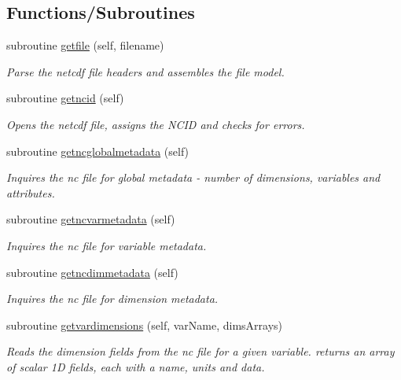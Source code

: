 \subsection*{Functions/\+Subroutines}
\begin{DoxyCompactItemize}
\item 
subroutine \mbox{\hyperlink{namespacenetcdfparser__mod_a57c39a4003778a6bf90cfd36b69380bc}{getfile}} (self, filename)
\begin{DoxyCompactList}\small\item\em Parse the netcdf file headers and assembles the file model. \end{DoxyCompactList}\item 
subroutine \mbox{\hyperlink{namespacenetcdfparser__mod_a741dd5b5985255e73aa9d3cf08755e91}{getncid}} (self)
\begin{DoxyCompactList}\small\item\em Opens the netcdf file, assigns the N\+C\+ID and checks for errors. \end{DoxyCompactList}\item 
subroutine \mbox{\hyperlink{namespacenetcdfparser__mod_a409f59662d71fb63e5fb5e057fdfd6ee}{getncglobalmetadata}} (self)
\begin{DoxyCompactList}\small\item\em Inquires the nc file for global metadata -\/ number of dimensions, variables and attributes. \end{DoxyCompactList}\item 
subroutine \mbox{\hyperlink{namespacenetcdfparser__mod_a46989199271acb6205cc61ac413d5a56}{getncvarmetadata}} (self)
\begin{DoxyCompactList}\small\item\em Inquires the nc file for variable metadata. \end{DoxyCompactList}\item 
subroutine \mbox{\hyperlink{namespacenetcdfparser__mod_a6354ee8b3c773cc7a5ad247ad1e34eeb}{getncdimmetadata}} (self)
\begin{DoxyCompactList}\small\item\em Inquires the nc file for dimension metadata. \end{DoxyCompactList}\item 
subroutine \mbox{\hyperlink{namespacenetcdfparser__mod_a0aea819b8a474ce2f4840d0bc44e95ec}{getvardimensions}} (self, var\+Name, dims\+Arrays)
\begin{DoxyCompactList}\small\item\em Reads the dimension fields from the nc file for a given variable. returns an array of scalar 1D fields, each with a name, units and data. \end{DoxyCompactList}\item 

\end{DoxyCompactItemize}
